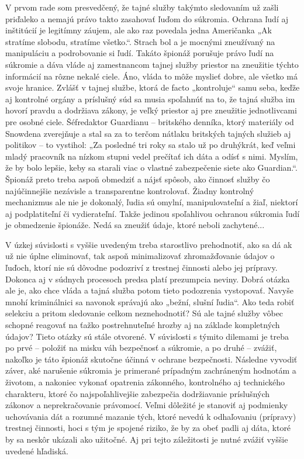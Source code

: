 \documentclass{article}
\begin{document}
V prvom rade som presvedčený, že tajné služby takýmto sledovaním už zašli priďaleko a nemajú právo takto zasahovať ľuďom do súkromia. Ochrana ľudí aj inštitúcií je legitímny záujem, ale ako raz povedala jedna Američanka „Ak stratíme slobodu, stratíme všetko.“. Strach bol a je mocnými zneužívaný na manipuláciu a podrobovanie si ľudí. Takáto špionáž porušuje právo ľudí na súkromie a dáva vláde aj zamestnancom tajnej služby priestor na zneužitie týchto informácií na rôzne nekalé ciele. Áno, vláda to môže myslieť dobre, ale všetko má svoje hranice. Zvlášť v tajnej službe, ktorá de facto „kontroluje“ samu seba, keďže aj kontrolné orgány a príslušný súd sa musia spoľahnúť na to, že tajná služba im hovorí pravdu a dodržiava zákony, je veľký priestor aj pre zneužitie jednotlivcami pre osobné ciele. Šéfredaktor Guardianu – britského denníka, ktorý materiály od Snowdena zverejňuje a stal sa za to terčom nátlaku britských tajných služieb aj politikov – to vystihol: „Za posledné tri roky sa stalo už po druhýkrát, keď veľmi mladý pracovník na nízkom stupni vedel prečítať ich dáta a odísť s nimi. Myslím, že by bolo lepšie, keby sa starali viac o vlastné zabezpečenie siete ako Guardian.“. Špionáž preto treba aspoň obmedziť a nájsť spôsob, ako činnosť služby čo najúčinnejšie nezávisle a transparentne kontrolovať. Žiadny kontrolný mechanizmus ale nie je dokonalý, ľudia sú omylní, manipulovateľní a žiaľ, niektorí aj podplatiteľní či vydierateľní. Takže jedinou spoľahlivou ochranou súkromia ľudí je obmedzenie špionáže. Nedá sa zneužiť údaje, ktoré neboli zachytené...

V úzkej súvislosti s vyššie uvedeným treba starostlivo prehodnotiť, ako sa dá ak už nie úplne eliminovať, tak aspoň minimalizovať zhromažďovanie údajov o ľuďoch, ktorí nie sú dôvodne podozriví z trestnej činnosti alebo jej prípravy. Dokonca aj v súdnych procesoch predsa platí prezumpcia neviny. Dobrá otázka ale je, ako chce vláda a tajná služba potom tieto podozrenia vystopovať. Navyše mnohí kriminálnici sa navonok správajú ako „bežní, slušní ľudia“. Ako teda robiť selekciu a pritom sledovanie celkom neznehodnotiť? Sú ale tajné služby vôbec schopné reagovať na ťažko postrehnuteľné hrozby aj na základe kompletných údajov? Tieto otázky sú stále otvorené. V súvislosti s týmito dilemami je treba po prvé – položiť na misku váh bezpečnosť a súkromie, a po druhé – zvážiť, nakoľko je táto špionáž skutočne účinná v ochrane bezpečnosti. Následne vyvodiť záver, aké narušenie súkromia je primerané prípadným zachráneným hodnotám a životom, a nakoniec vykonať opatrenia zákonného, kontrolného aj technického charakteru, ktoré čo najspoľahlivejšie zabezpečia dodržiavanie príslušných zákonov a neprekračovanie právomocí. Veľmi dôležité je stanoviť aj podmienky uchovávania dát a rozumné mazanie tých, ktoré nevedú k odhaľovaniu (prípravy) trestnej činnosti, hoci s tým je spojené riziko, že by za obeť padli aj dáta, ktoré by sa neskôr ukázali ako užitočné. Aj pri tejto záležitosti je nutné zvážiť vyššie uvedené hľadiská.
\end{document}
